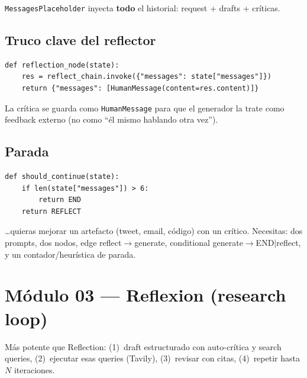 \documentclass[11pt,a4paper]{article}
\begin{document}
\texttt{MessagesPlaceholder} inyecta \textbf{todo} el historial: request + drafts + críticas.

\subsection{Truco clave del reflector}
\begin{lstlisting}
def reflection_node(state):
    res = reflect_chain.invoke({"messages": state["messages"]})
    return {"messages": [HumanMessage(content=res.content)]}
\end{lstlisting}

La crítica se guarda como \texttt{HumanMessage} para que el generador la trate como feedback externo
(no como ``él mismo hablando otra vez'').

\subsection{Parada}
\begin{lstlisting}
def should_continue(state):
    if len(state["messages"]) > 6:
        return END
    return REFLECT
\end{lstlisting}

\begin{howto}[title=Reutiliza Reflection cuando\ldots]
\ldots{}quieras mejorar un artefacto (tweet, email, código) con un crítico.
Necesitas: dos prompts, dos nodos, edge reflect$\to$generate, conditional generate$\to$END|reflect, y un contador/heurística de parada.
\end{howto}

\section{Módulo 03 --- Reflexion (research loop)}
\label{sec:reflexion}

\begin{concept}[title=Idea]
Más potente que Reflection:
(1)~draft estructurado con auto-crítica y search queries,
(2)~ejecutar esas queries (Tavily),
(3)~revisar con citas,
(4)~repetir hasta $N$ iteraciones.
\end{concept}

\begin{center}
\end{center}
\end{document}
